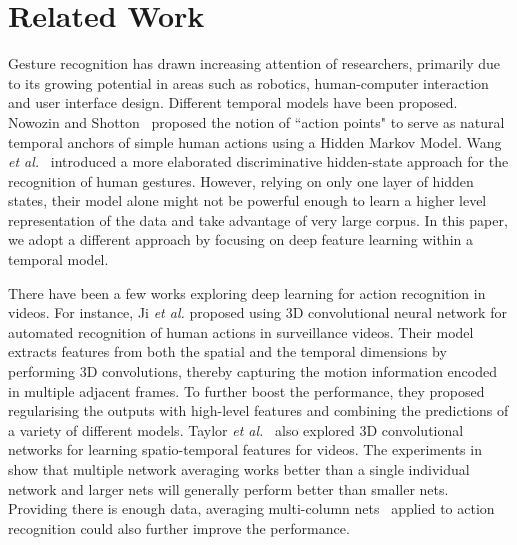 
\section{Related Work}
\label{sec:relatedwork}

Gesture recognition has drawn increasing attention of researchers, primarily due to its growing potential in areas such as robotics, human-computer interaction and user interface design. Different temporal models have been proposed.
Nowozin and Shotton~\cite{nowozin2012action} proposed the notion of ``action points" to serve as natural temporal anchors of simple human actions using a Hidden Markov Model.
Wang \emph{et al.}~\cite{wang2006hidden} introduced a more elaborated discriminative hidden-state approach for the recognition of human gestures.
However, relying on only one layer of hidden states,
their model alone might not  be powerful enough to learn a higher level representation of the data and take advantage of very large corpus. In this paper, we adopt a different approach by focusing on deep feature learning within a temporal model.

There have been a few works exploring deep learning for action recognition in videos. For instance, Ji \emph{et al.}\cite{ji20133d} proposed using 3D convolutional neural network for automated recognition of human actions in surveillance videos. Their model extracts features from both the spatial and the temporal dimensions by performing 3D convolutions, thereby capturing the motion information encoded in multiple adjacent frames. To further boost the performance, they proposed regularising the outputs with high-level features and combining the predictions of a variety of different models. Taylor \emph{et al.}~\cite{taylor2010convolutional}  also explored 3D convolutional networks for learning spatio-temporal features for videos. The experiments in~\cite{wu2014deep} show that multiple network averaging works better than a single individual network and larger nets  will generally perform better than smaller nets.
Providing there is enough data, averaging multi-column nets~\cite{ciresan2012multi} applied to
action recognition could also further improve the performance.

